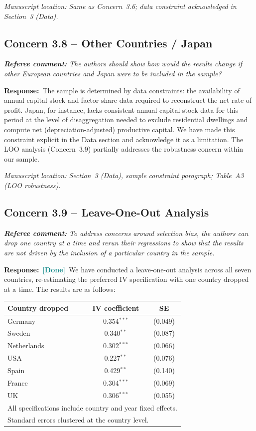 \documentclass[11pt]{article}
\newcommand{\RC}[1]{\begin{refereebox}\textit{\textbf{Referee comment:} #1}\end{refereebox}}
\newcommand{\AR}{\noindent\textbf{Response:}\ }
\newcommand{\done}{\textcolor{teal}{\textbf{[Done]}}}
\begin{document}
\smallskip\noindent\textit{Manuscript location: Same as Concern~3.6; data constraint acknowledged in Section~3 (Data).}

\subsection*{Concern 3.8 -- Other Countries / Japan}

\RC{The authors should show how would the results change if other European countries and Japan were to be included in the sample?}

\AR The sample is determined by data constraints: the availability of annual capital stock and factor share data required to reconstruct the net rate of profit. Japan, for instance, lacks consistent annual capital stock data for this period at the level of disaggregation needed to exclude residential dwellings and compute net (depreciation-adjusted) productive capital. We have made this constraint explicit in the Data section and acknowledge it as a limitation. The LOO analysis (Concern~3.9) partially addresses the robustness concern within our sample.

\smallskip\noindent\textit{Manuscript location: Section~3 (Data), sample constraint paragraph; Table~A3 (LOO robustness).}

\subsection*{Concern 3.9 -- Leave-One-Out Analysis}

\RC{To address concerns around selection bias, the authors can drop one country at a time and rerun their regressions to show that the results are not driven by the inclusion of a particular country in the sample.}

\AR \done\ We have conducted a leave-one-out analysis across all seven countries, re-estimating the preferred IV specification with one country dropped at a time. The results are as follows:

\medskip
\begin{center}
\small
\begin{tabular}{lcc}
\toprule
\textbf{Country dropped} & \textbf{IV coefficient} & \textbf{SE} \\
\midrule
Germany     & 0.354$^{***}$ & (0.049) \\
Sweden      & 0.340$^{**}$  & (0.087) \\
Netherlands & 0.302$^{***}$ & (0.066) \\
USA         & 0.227$^{**}$  & (0.076) \\
Spain       & 0.429$^{**}$  & (0.140) \\
France      & 0.304$^{***}$ & (0.069) \\
UK          & 0.306$^{***}$ & (0.055) \\
\bottomrule
\multicolumn{3}{l}{\footnotesize All specifications include country and year fixed effects.}\\
\multicolumn{3}{l}{\footnotesize Standard errors clustered at the country level.}
\end{tabular}
\end{center}
\medskip
\end{document}
